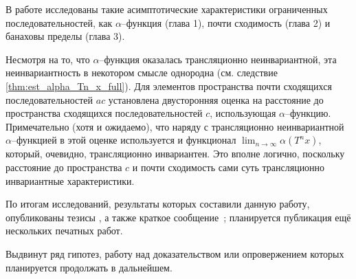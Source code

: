 В работе исследованы такие асимптотические характеристики ограниченных последовательностей,
как $\alpha$--функция (глава 1),  почти сходимость (глава 2) и банаховы пределы (глава 3).

Несмотря на то, что $\alpha$--функция оказалась трансляционно неинвариантной,
эта неинвариантность в некотором смысле однородна (см. следствие \ref{thm:est_alpha_Tn_x_full}).
Для элементов пространства почти сходящихся последовательностей $ac $
установлена двусторонняя оценка на расстояние до пространства сходящихся последовательностей $c$,
использующая $\alpha$--функцию.
Примечательно (хотя и ожидаемо), что наряду с трансляционно неинвариантной $\alpha$--функцией
в этой оценке используется и функционал $\lim_{n\to\infty}\alpha(T^n x)$,
который, очевидно, трансляционно инвариантен.
Это вполне логично, поскольку расстояние до пространства $c$ и почти сходимость
сами суть трансляционно инвариантные характеристики.




По итогам исследований, результаты которых составили данную работу,
опубликованы тезисы \cite{our-vvmsh-2018,our-vzms-2018,our-ped-2018-inf-dim-ker,our-ped-2018-alpha-Tx},
а также краткое сообщение~\cite{our-mz2019ac0};
планируется публикация ещё нескольких печатных работ.

Выдвинут ряд гипотез,
работу над доказательством или опровержением которых планируется продолжать в дальнейшем.
